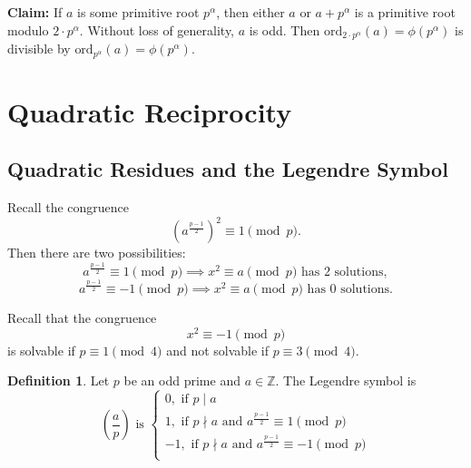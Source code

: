 \documentclass[11pt]{article}
\theoremstyle{definition}
\newtheorem{defn}{Definition}[section]
\newcommand{\ord}[0]{\text{ord}}
\newcommand{\Claim}[0]{\noindent\textbf{Claim: }}
\newcommand{\et}[0]{\text{ and }}
\newcommand{\ZZ}{\mathbb{Z}}
\begin{document}
	\Claim If $a$ is some primitive root $p^\alpha$, then either $a$ or $a+p^\alpha$ is a primitive root modulo $2\cdot p^\alpha$. 
	\proof
		Without loss of generality, $a$ is odd. Then $\ord_{2\cdot p^\alpha}(a) = \phi(p^\alpha)$ is divisible by $\ord_{p^\alpha}(a) = \phi(p^\alpha)$. 
	\qedhere
	



\section{Quadratic Reciprocity}

\subsection{Quadratic Residues and the Legendre Symbol}

Recall the congruence 
$$ (a^{\frac{p-1}{2}})^2 \equiv 1 \pmod{p} . $$
Then there are two possibilities:
$$ a^{\frac{p-1}{2}} \equiv 1 \pmod{p} \implies x^2 \equiv a \pmod{p} \text{ has 2 solutions} , $$
$$ a^{\frac{p-1}{2}} \equiv -1 \pmod{p} \implies x^2 \equiv a \pmod{p} \text{ has 0 solutions} . $$

Recall that the congruence
$$ x^2 \equiv -1 \pmod{p} $$ 
is solvable if $p \equiv 1 \pmod{4}$ and not solvable if $p \equiv 3 \pmod{4}$. 

\begin{defn}
	Let $p$ be an odd prime and $a\in\ZZ$. The Legendre symbol is 
	$$ \left(\frac{a}{p}\right) \text{ is } 
	\begin{cases}
		0, \text{ if } p\mid a \\
		1, \text{ if } p\nmid a \et a^\frac{p-1}{2} \equiv 1 \pmod{p} \\
		-1, \text{ if } p\nmid a \et a^\frac{p-1}{2} \equiv -1 \pmod{p} \\
	\end{cases} $$
\end{defn}
\end{document}
